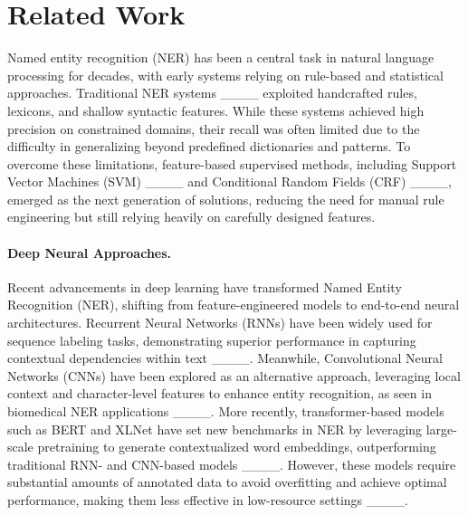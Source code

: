 \section{Related Work}
Named entity recognition (NER) has been a central task in natural language processing for decades, with early systems relying on rule-based and statistical approaches. Traditional NER systems ____ exploited handcrafted rules, lexicons, and shallow syntactic features. While these systems achieved high precision on constrained domains, their recall was often limited due to the difficulty in generalizing beyond predefined dictionaries and patterns. To overcome these limitations, feature-based supervised methods, including Support Vector Machines (SVM) ____ and Conditional Random Fields (CRF) ____, emerged as the next generation of solutions, reducing the need for manual rule engineering but still relying heavily on carefully designed features.

\paragraph{Deep Neural Approaches.}  
Recent advancements in deep learning have transformed Named Entity Recognition (NER), shifting from feature-engineered models to end-to-end neural architectures. Recurrent Neural Networks (RNNs) have been widely used for sequence labeling tasks, demonstrating superior performance in capturing contextual dependencies within text ____. Meanwhile, Convolutional Neural Networks (CNNs) have been explored as an alternative approach, leveraging local context and character-level features to enhance entity recognition, as seen in biomedical NER applications ____. More recently, transformer-based models such as BERT and XLNet have set new benchmarks in NER by leveraging large-scale pretraining to generate contextualized word embeddings, outperforming traditional RNN- and CNN-based models ____. However, these models require substantial amounts of annotated data to avoid overfitting and achieve optimal performance, making them less effective in low-resource settings ____.

